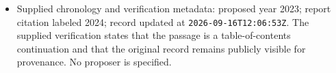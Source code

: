 \documentclass[11pt]{article}
\begin{document}
\begin{itemize}
\item Supplied chronology and verification metadata: proposed year 2023; report citation labeled 2024; record updated at \texttt{2026-09-16T12:06:53Z}. The supplied verification states that the passage is a table-of-contents continuation and that the original record remains publicly visible for provenance. No proposer is specified.
\end{itemize}
\end{document}
